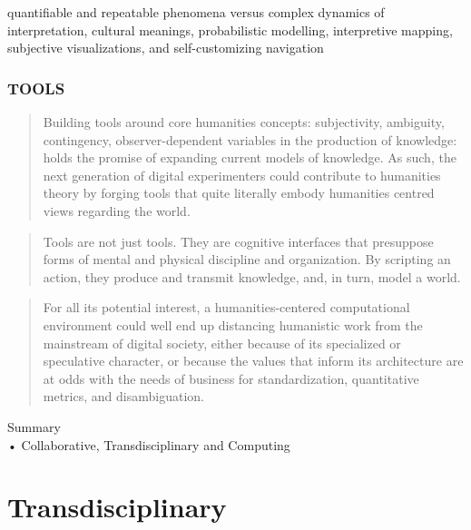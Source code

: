 \begin{draft}
  \begin{draft}
    quantifiable and repeatable phenomena versus complex dynamics of interpretation, cultural meanings, probabilistic modelling, interpretive mapping, subjective visualizations, and self-customizing navigation \autocite[p.103]{Burdick2012}
  \end{draft}

  \subsubsection*{TOOLS}
  \begin{quote}
    Building tools around core humanities concepts: subjectivity, ambiguity, contingency, observer-dependent variables in the production of knowledge: holds the promise of expanding current models of knowledge. As such, the next generation of digital experimenters could contribute to humanities theory by forging tools that quite literally embody humanities centred views regarding the world. \autocite[p.104]{Burdick2012}
  \end{quote}

  \begin{quote}
    Tools are not just tools. They are cognitive interfaces that presuppose forms of mental and physical discipline and organization. By scripting an action, they produce and transmit knowledge, and, in turn, model a world. \autocite[p.105]{Burdick2012}
  \end{quote}

  \begin{quote}
    For all its potential interest, a humanities-centered computational environment could well end up distancing humanistic work from the mainstream of digital society, either because of its specialized or speculative character, or because the values that inform its architecture are at odds with the needs of business for standardization, quantitative metrics, and disambiguation. \autocite[p.105]{Burdick2012}
  \end{quote}

  \begin{shaded}
  Summary\\
  •	Collaborative, Transdisciplinary and Computing
  \end{shaded}
\end{draft}


\section{Transdisciplinary}

